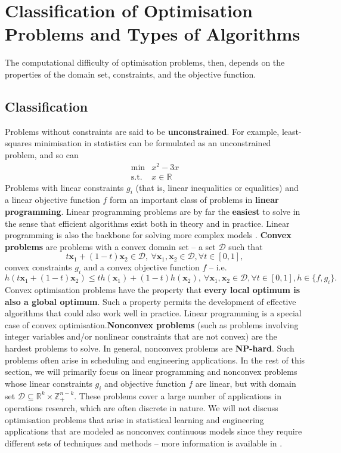 \section{Classification of Optimisation Problems and Types of Algorithms}
The computational difficulty of optimisation problems, then, depends on the
properties of the domain set, constraints, and the objective function.
\subsection{Classification} Problems without constraints are said to be \textbf{unconstrained}. For
example, least-squares minimisation in statistics can be formulated as
an unconstrained problem, and so can \[\begin{array}{rl}
\min & x^2 - 3x \\
\mbox{s.t.} & x \in \mathbb{R}
\end{array}\]
Problems with linear constraints $g_i$ (that is, linear inequalities or
equalities) and a linear objective function $f$ form an important class of
problems in \textbf{linear programming}. Linear programming problems are by far 
the \textbf{easiest} to solve in the sense that efficient algorithms exist
both in theory and in practice. Linear programming is also the backbone
for solving more complex models  \cite{OPT_BT}.
\newl
\textbf{Convex problems} are problems with a convex domain set -- a set $\mathcal{D}$ such that $$t\mathbf{x}_1+(1-t)\mathbf{x}_2\in \mathcal{D},\ \forall \mathbf{x}_1,\mathbf{x}_2\in \mathcal{D},\forall t\in [0,1],$$ convex
constraints $g_i$ and a convex objective function $f$ -- i.e.  $$h(t\mathbf{x}_1+(1-t)\mathbf{x}_2)\leq th(\mathbf{x}_1)+(1-t)h(\mathbf{x}_2),\ \forall \mathbf{x}_1,\mathbf{x}_2\in \mathcal{D},\forall t\in [0,1], h\in \{f,g_i\}.$$ Convex optimisation
problems have the property that \textbf{every local optimum is also a global
optimum}. Such a property permits the development of effective algorithms
that could also work well in practice. Linear programming is a special
case of convex optimisation.\newl \textbf{Nonconvex problems} (such as problems involving integer variables and/or nonlinear constraints that are not convex) are the hardest problems to
solve. In general, nonconvex problems are \textbf{NP-hard}. Such problems often arise in scheduling and engineering applications.
\newl In the rest of this section, we will primarily focus  on linear programming and nonconvex
problems whose linear constraints $g_i$ and objective function $f$ are linear, but with domain set $\mathcal{D}\subseteq \mathbb{R}^k \times \mathbb{Z}_+^{n-k}$. These
problems cover a large number of applications in operations research, 
which are often discrete in nature.
\newl We will not discuss optimisation problems that arise in statistical learning and engineering
applications that are modeled as nonconvex continuous models since they require different sets of techniques
and methods -- more information is available in \cite{OPT_B}.

